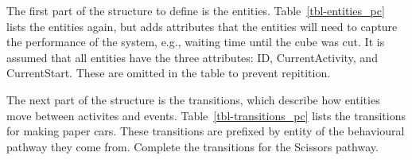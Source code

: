 \documentclass[
  10pt,
  a4paperpaper,
  DIV=11,
  numbers=noendperiod,
  oneside]{scrreprt}
\begin{document}
The first part of the structure to define is the entities.
Table~\ref{tbl-entities_pc} lists the entities again, but adds
attributes that the entities will need to capture the performance of the
system, e.g., waiting time until the cube was cut. It is assumed that
all entities have the three attributes: ID, CurrentActivity, and
CurrentStart. These are omitted in the table to prevent repitition.

\begin{table}

\caption{\label{tbl-entities_pc}List of Entities}


\end{table}%

The next part of the structure is the transitions, which describe how
entities move between activites and events.
Table~\ref{tbl-transitions_pc} lists the transitions for making paper
cars. These transitions are prefixed by entity of the behavioural
pathway they come from. Complete the transitions for the Scissors
pathway.
\end{document}

